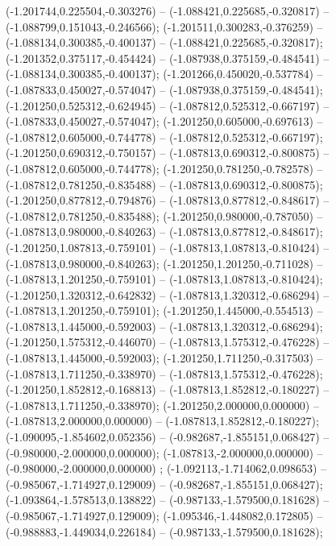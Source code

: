  (-1.201744,0.225504,-0.303276) -- (-1.088421,0.225685,-0.320817) -- (-1.088799,0.151043,-0.246566);
 (-1.201511,0.300283,-0.376259) -- (-1.088134,0.300385,-0.400137) -- (-1.088421,0.225685,-0.320817);
 (-1.201352,0.375117,-0.454424) -- (-1.087938,0.375159,-0.484541) -- (-1.088134,0.300385,-0.400137);
 (-1.201266,0.450020,-0.537784) -- (-1.087833,0.450027,-0.574047) -- (-1.087938,0.375159,-0.484541);
 (-1.201250,0.525312,-0.624945) -- (-1.087812,0.525312,-0.667197) -- (-1.087833,0.450027,-0.574047);
 (-1.201250,0.605000,-0.697613) -- (-1.087812,0.605000,-0.744778) -- (-1.087812,0.525312,-0.667197);
 (-1.201250,0.690312,-0.750157) -- (-1.087813,0.690312,-0.800875) -- (-1.087812,0.605000,-0.744778);
 (-1.201250,0.781250,-0.782578) -- (-1.087812,0.781250,-0.835488) -- (-1.087813,0.690312,-0.800875);
 (-1.201250,0.877812,-0.794876) -- (-1.087813,0.877812,-0.848617) -- (-1.087812,0.781250,-0.835488);
 (-1.201250,0.980000,-0.787050) -- (-1.087813,0.980000,-0.840263) -- (-1.087813,0.877812,-0.848617);
 (-1.201250,1.087813,-0.759101) -- (-1.087813,1.087813,-0.810424) -- (-1.087813,0.980000,-0.840263);
 (-1.201250,1.201250,-0.711028) -- (-1.087813,1.201250,-0.759101) -- (-1.087813,1.087813,-0.810424);
 (-1.201250,1.320312,-0.642832) -- (-1.087813,1.320312,-0.686294) -- (-1.087813,1.201250,-0.759101);
 (-1.201250,1.445000,-0.554513) -- (-1.087813,1.445000,-0.592003) -- (-1.087813,1.320312,-0.686294);
 (-1.201250,1.575312,-0.446070) -- (-1.087813,1.575312,-0.476228) -- (-1.087813,1.445000,-0.592003);
 (-1.201250,1.711250,-0.317503) -- (-1.087813,1.711250,-0.338970) -- (-1.087813,1.575312,-0.476228);
 (-1.201250,1.852812,-0.168813) -- (-1.087813,1.852812,-0.180227) -- (-1.087813,1.711250,-0.338970);
 (-1.201250,2.000000,0.000000) -- (-1.087813,2.000000,0.000000) -- (-1.087813,1.852812,-0.180227);
 (-1.090095,-1.854602,0.052356) -- (-0.982687,-1.855151,0.068427) -- (-0.980000,-2.000000,0.000000);
 (-1.087813,-2.000000,0.000000) -- (-0.980000,-2.000000,0.000000) ;
 (-1.092113,-1.714062,0.098653) -- (-0.985067,-1.714927,0.129009) -- (-0.982687,-1.855151,0.068427);
 (-1.093864,-1.578513,0.138822) -- (-0.987133,-1.579500,0.181628) -- (-0.985067,-1.714927,0.129009);
 (-1.095346,-1.448082,0.172805) -- (-0.988883,-1.449034,0.226184) -- (-0.987133,-1.579500,0.181628);
